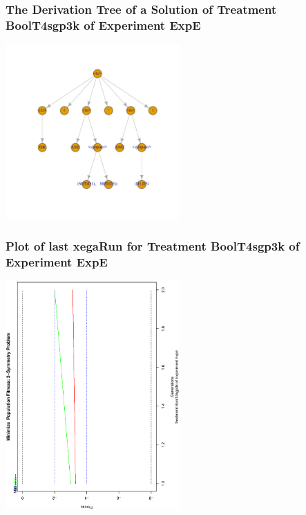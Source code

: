 \documentclass[18pt,c]{beamer}
\begin{document}
 \begin{frame}
 \frametitle{ The Derivation Tree of a Solution of Treatment BoolT4sgp3k of Experiment ExpE }
 \begin{center}
\includegraphics[width=0.5\textwidth, angle=0]
{ExpEDerivationTreeFigure001.pdf}
 \end{center}
 \label{report/ExpEDerivationTreeFigure001.pdf}  
 \end{frame}

 \begin{frame}
 \frametitle{ Plot of last xegaRun for Treatment BoolT4sgp3k of Experiment ExpE }
 \begin{center}
\includegraphics[width=0.5\textwidth, angle=-90]
{ExpEPlotPopStatsFigure001.eps}
 \end{center}
 \label{report/ExpEPlotPopStatsFigure001.eps}  
 \end{frame}
\end{document}
